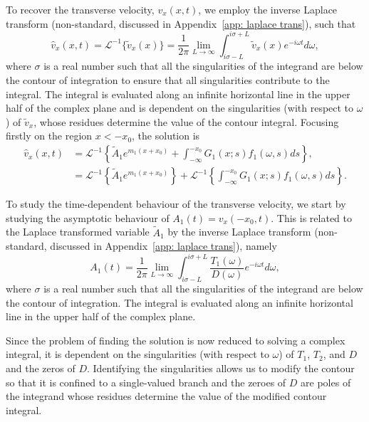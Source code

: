 \documentclass[12pt]{../style-files/ociamthesis}
\begin{document}
To recover the transverse velocity, $v_x(x, t)$, we employ the inverse Laplace transform (non-standard, discussed in Appendix~\ref{app: laplace trans}), such that
\begin{equation}
\hat{v}_x(x,t) = \mathcal{L}^{-1}\{\tilde{v}_x(x)\} = \frac{1}{2\pi} \lim_{L \to \infty} \int_{i\sigma - L}^{i\sigma + L} \tilde{v}_x(x) e^{-i\omega t} d\omega,
\label{laplace transform}
\end{equation}
where $\sigma$ is a real number such that all the singularities of the integrand are below the contour of integration to ensure that all singularities contribute to the integral. The integral is evaluated along an infinite horizontal line in the upper half of the complex plane and is dependent on the singularities (with respect to $\omega$) of $\tilde{v}_x$, whose residues determine the value of the contour integral. Focusing firstly on the region $x < -x_0$, the solution is
\begin{align}
\hat{v}_x(x, t) &= \mathcal{L}^{-1} \left\{ \tilde{A}_1 e^{m_1(x + x_0)} + \int_{-\infty}^{-x_0} G_1(x; s)f_1(\omega, s)ds \right\}, \\
&= \mathcal{L}^{-1} \left\{ \tilde{A}_1 e^{m_1(x + x_0)} \right\} + \mathcal{L}^{-1} \left\{ \int_{-\infty}^{-x_0} G_1(x; s)f_1(\omega, s)ds \right\}.
\label{vx sol inv LPT}
\end{align}

To study the time-dependent behaviour of the transverse velocity, we start by studying the asymptotic behaviour of $A_1(t) = v_x(-x_0, t)$. This is related to the Laplace transformed variable $\tilde{A}_1$ by the inverse Laplace transform (non-standard, discussed in Appendix~\ref{app: laplace trans}), namely
\begin{equation}
A_1(t) = \frac{1}{2\pi} \lim_{L \to \infty} \int_{i\sigma - L}^{i\sigma + L} \frac{T_1(\omega)}{D(\omega)} e^{-i\omega t} d\omega,
\label{A inv laplace}
\end{equation}
where $\sigma$ is a real number such that all the singularities of the integrand are below the contour of integration. The integral is evaluated along an infinite horizontal line in the upper half of the complex plane.

Since the problem of finding the solution is now reduced to solving a complex integral, it is dependent on the singularities (with respect to $\omega$) of $T_1$, $T_2$, and $D$ and the zeros of $D$. Identifying the singularities allows us to modify the contour so that it is confined to a single-valued branch and the zeroes of $D$ are poles of the integrand whose residues determine the value of the modified contour integral.
\end{document}
